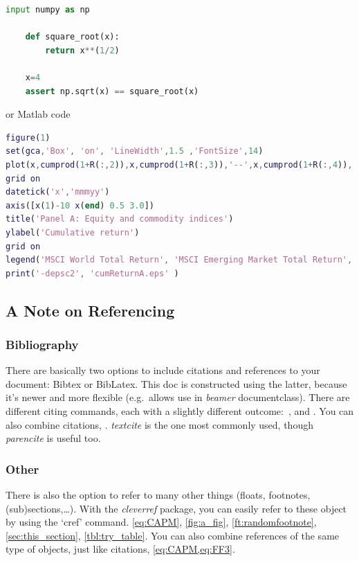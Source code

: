 \documentclass[11pt,a4paper,english,oneside]{book}
\begin{document}
\begin{lstlisting}[language=Python]
    input numpy as np

    def square_root(x):
        return x**(1/2)
    
    x=4
    assert np.sqrt(x) == square_root(x)
\end{lstlisting}

or Matlab code

\begin{lstlisting}[language=matlab]
figure(1)
set(gca,'Box', 'on', 'LineWidth',1.5 ,'FontSize',14)
plot(x,cumprod(1+R(:,2)),x,cumprod(1+R(:,3)),'--',x,cumprod(1+R(:,4)),'-.','LineWidth',1.5)
grid on
datetick('x','mmmyy')
axis([x(1)-10 x(end) 0.5 3.0])
title('Panel A: Equity and commodity indices')
ylabel('Cumulative return')
grid on
legend('MSCI World Total Return', 'MSCI Emerging Market Total Return','DJ UBS Commodity Index')
print('-depsc2', 'cumReturnA.eps' )
\end{lstlisting}



\subsection{A Note on Referencing}
\subsubsection{Bibliography}
There are basically two options to include citations and references to your document: Bibtex or BibLatex. This doc is constructed using the latter, because it's newer and more flexible (e.g.\ allows use in \emph{beamer} documentclass). There are different citing commands, each with a slightly different outcome:~\cite{BA1996}, \textcite{CW2004} and \parencite{SH1993,BA1996}. You can also combine citations, \textcite{petkova2006fama,CW2004}. \emph{textcite} is the one most commonly used, though \emph{parencite} is useful too.

\subsubsection{Other\label{sec:this_section}}
There is also the option to refer to many other things (floats, footnotes, (sub)sections,\ldots).  With the \emph{cleverref} package, you can easily refer to these object by using the `cref' command.  \cref{eq:CAPM}, \cref{fig:a_fig}, \cref{ft:randomfootnote}, \cref{sec:this_section}, \cref{tbl:try_table}. You can also combine references of the same type of objects, just like citations, \cref{eq:CAPM,eq:FF3}.
\end{document}
